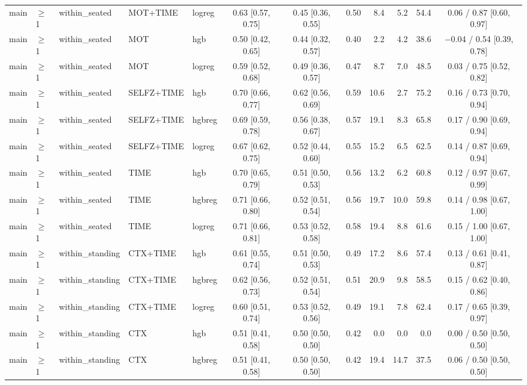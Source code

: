 \begin{longtable}{@{}lllllcccrrrc@{}}
main & $\geq$1 & within\_seated & MOT+TIME & logreg & 0.63 [0.57, 0.75] & 0.45 [0.36, 0.55] & 0.50 & 8.4 & 5.2 & 54.4 & 0.06 / 0.87 [0.60, 0.97] \\
main & $\geq$1 & within\_seated & MOT & hgb & 0.50 [0.42, 0.65] & 0.44 [0.32, 0.57] & 0.40 & 2.2 & 4.2 & 38.6 & $-$0.04 / 0.54 [0.39, 0.78] \\
main & $\geq$1 & within\_seated & MOT & logreg & 0.59 [0.52, 0.68] & 0.49 [0.36, 0.57] & 0.47 & 8.7 & 7.0 & 48.5 & 0.03 / 0.75 [0.52, 0.82] \\
main & $\geq$1 & within\_seated & SELFZ+TIME & hgb & 0.70 [0.66, 0.77] & 0.62 [0.56, 0.69] & 0.59 & 10.6 & 2.7 & 75.2 & 0.16 / 0.73 [0.70, 0.94] \\
main & $\geq$1 & within\_seated & SELFZ+TIME & hgbreg & 0.69 [0.59, 0.78] & 0.56 [0.38, 0.67] & 0.57 & 19.1 & 8.3 & 65.8 & 0.17 / 0.90 [0.69, 0.94] \\
main & $\geq$1 & within\_seated & SELFZ+TIME & logreg & 0.67 [0.62, 0.75] & 0.52 [0.44, 0.60] & 0.55 & 15.2 & 6.5 & 62.5 & 0.14 / 0.87 [0.69, 0.94] \\
main & $\geq$1 & within\_seated & TIME & hgb & 0.70 [0.65, 0.79] & 0.51 [0.50, 0.53] & 0.56 & 13.2 & 6.2 & 60.8 & 0.12 / 0.97 [0.67, 0.99] \\
main & $\geq$1 & within\_seated & TIME & hgbreg & 0.71 [0.66, 0.80] & 0.52 [0.51, 0.54] & 0.56 & 19.7 & 10.0 & 59.8 & 0.14 / 0.98 [0.67, 1.00] \\
main & $\geq$1 & within\_seated & TIME & logreg & 0.71 [0.66, 0.81] & 0.53 [0.52, 0.58] & 0.58 & 19.4 & 8.8 & 61.6 & 0.15 / 1.00 [0.67, 1.00] \\
main & $\geq$1 & within\_standing & CTX+TIME & hgb & 0.61 [0.55, 0.74] & 0.51 [0.50, 0.53] & 0.49 & 17.2 & 8.6 & 57.4 & 0.13 / 0.61 [0.41, 0.87] \\
main & $\geq$1 & within\_standing & CTX+TIME & hgbreg & 0.62 [0.56, 0.73] & 0.52 [0.51, 0.54] & 0.51 & 20.9 & 9.8 & 58.5 & 0.15 / 0.62 [0.40, 0.86] \\
main & $\geq$1 & within\_standing & CTX+TIME & logreg & 0.60 [0.51, 0.74] & 0.53 [0.52, 0.56] & 0.49 & 19.1 & 7.8 & 62.4 & 0.17 / 0.65 [0.39, 0.97] \\
main & $\geq$1 & within\_standing & CTX & hgb & 0.51 [0.41, 0.58] & 0.50 [0.50, 0.50] & 0.42 & 0.0 & 0.0 & 0.0 & 0.00 / 0.50 [0.50, 0.50] \\
main & $\geq$1 & within\_standing & CTX & hgbreg & 0.51 [0.41, 0.58] & 0.50 [0.50, 0.50] & 0.42 & 19.4 & 14.7 & 37.5 & 0.06 / 0.50 [0.50, 0.50] \\

\end{longtable}
